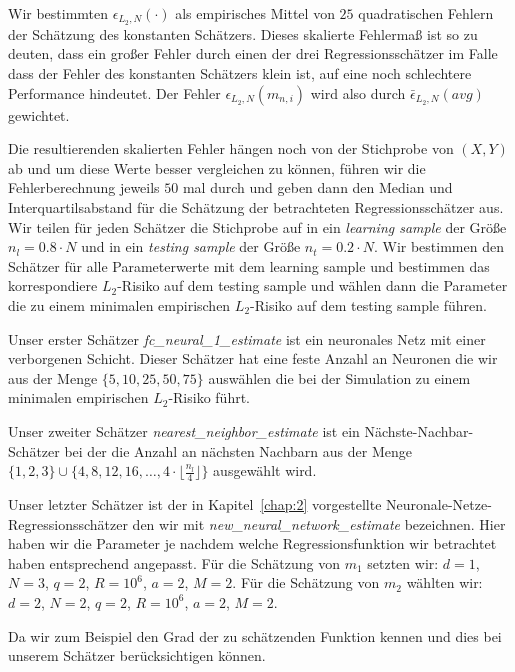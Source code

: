{Wir bestimmten $\epsilon_{L_2,N}(\cdot)$ als empirisches Mittel von $25$ quadratischen Fehlern der Schätzung des konstanten Schätzers. Dieses skalierte Fehlermaß ist so zu deuten, dass ein großer Fehler durch einen der drei Regressionsschätzer im Falle dass der Fehler des konstanten Schätzers klein ist, auf eine noch schlechtere Performance hindeutet. Der Fehler $\epsilon_{L_2,N}(m_{n,i})$ wird also durch $\bar{\epsilon}_{L_2,N}(avg)$ gewichtet.

Die resultierenden skalierten Fehler hängen noch von der Stichprobe von $(X, Y)$ ab und um diese Werte besser vergleichen zu können, führen wir die Fehlerberechnung jeweils $50$ mal durch und geben dann den Median und Interquartilsabstand für die Schätzung der betrachteten Regressionsschätzer aus.
Wir teilen für jeden Schätzer die Stichprobe auf in ein \textit{learning sample} der Größe $n_l = 0.8 \cdot N$ und in ein \textit{testing sample} der Größe $n_t = 0.2 \cdot N$. Wir bestimmen den Schätzer für alle Parameterwerte mit dem learning sample und bestimmen das korrespondiere $L_2$-Risiko auf dem testing sample und wählen dann die Parameter die zu einem minimalen empirischen $L_2$-Risiko auf dem testing sample führen.

Unser erster Schätzer \textit{fc\_neural\_1\_estimate} ist ein neuronales Netz mit einer verborgenen Schicht. Dieser Schätzer hat eine feste Anzahl an Neuronen die wir aus der Menge $\{5, 10, 25, 50, 75\}$ auswählen die bei der Simulation zu einem minimalen empirischen $L_2$-Risiko führt.

Unser zweiter Schätzer \textit{nearest\_neighbor\_estimate} ist ein Nächste-Nachbar-Schätzer bei der die Anzahl an nächsten Nachbarn aus der Menge $\{1, 2, 3\} \cup \{4, 8, 12, 16, \dots, 4 \cdot \lfloor\frac{n_l}{4}\rfloor\}$ ausgewählt wird.

Unser letzter Schätzer ist der in Kapitel~\ref{chap:2} vorgestellte Neuronale-Netze-Regressionsschätzer den wir mit \textit{new\_neural\_network\_estimate} bezeichnen. Hier haben wir die Parameter je nachdem welche Regressionsfunktion wir betrachtet haben entsprechend angepasst. Für die Schätzung von $m_1$ setzten wir: $d = 1$, $N = 3$, $q = 2$, $R = 10^6$, $a = 2$, $M = 2$.
Für die Schätzung von $m_2$ wählten wir: $d = 2$, $N = 2$, $q = 2$, $R = 10^6$, $a = 2$, $M = 2$.

Da wir zum Beispiel den Grad der zu schätzenden Funktion kennen und dies bei unserem Schätzer berücksichtigen können.

}

